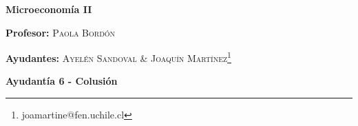 \documentclass{exam}
\begin{document}
\begin{center}

\LARGE{\textbf{Microeconomía II}}

\medskip
\normalsize \textbf{Profesor:} \textsc{Paola Bordón}

\normalsize \textbf{Ayudantes:} \textsc{Ayelén Sandoval \& Joaquín Martínez}\footnote[2]{joamartine@fen.uchile.cl}


\medskip
\large{\textbf{Ayudantía 6 - Colusión}}

\end{center}

\tableofcontents




\end{document}
